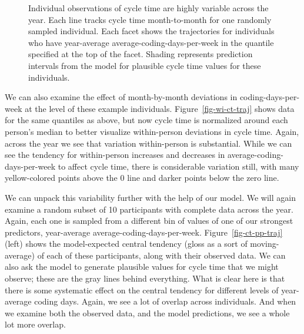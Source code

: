\documentclass[
]{article}
\begin{document}
\begin{figure}[htbp]


\caption[Individual observations of cycle time are highly variable
across the year]{\label{fig-bw-ct-traj}Individual observations of cycle
time are highly variable across the year. Each line tracks cycle time
month-to-month for one randomly sampled individual. Each facet shows the
trajectories for individuals who have year-average
average-coding-days-per-week in the quantile specified at the top of the
facet. Shading represents prediction intervals from the model for
plausible cycle time values for these individuals.}

\end{figure}%

We can also examine the effect of month-by-month deviations in
coding-days-per-week at the level of these example individuals.
Figure~\ref{fig-wi-ct-traj} shows data for the same quantiles as above,
but now cycle time is normalized around each person's median to better
visualize within-person deviations in cycle time. Again, across the year
we see that variation within-person is substantial. While we can see the
tendency for within-person increases and decreases in
average-coding-days-per-week to affect cycle time, there is considerable
variation still, with many yellow-colored points above the 0 line and
darker points below the zero line.

We can unpack this variability further with the help of our model. We
will again examine a random subset of 10 participants with complete data
across the year. Again, each one is sampled from a different bin of
values of one of our strongest predictors, year-average
average-coding-days-per-week. Figure~\ref{fig-ct-pp-traj} (left) shows
the model-expected central tendency (gloss as a sort of moving-average)
of each of these participants, along with their observed data. We can
also ask the model to generate plausible values for cycle time that we
might observe; these are the gray lines behind everything. What is clear
here is that there is some systematic effect on the central tendency for
different levels of year-average coding days. Again, we see a lot of
overlap across individuals. And when we examine both the observed data,
and the model predictions, we see a whole lot more overlap.
\end{document}
